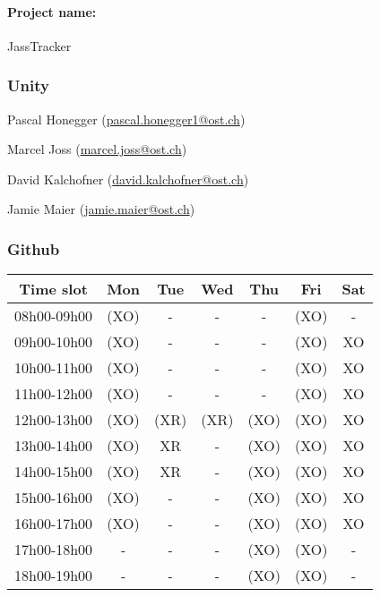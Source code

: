 \paragraph{Project name:} JassTracker

\subsubsection*{Unity}

\begin{compactenum}
    \item Pascal Honegger (\href{mailto:pascal.honegger1@ost.ch}{pascal.honegger1@ost.ch})
    \item Marcel Joss (\href{mailto:marcel.joss@ost.ch}{marcel.joss@ost.ch})
    \item David Kalchofner (\href{mailto:david.kalchofner@ost.ch}{david.kalchofner@ost.ch})
    \item Jamie Maier (\href{mailto:jamie.maier@ost.ch}{jamie.maier@ost.ch})
\end{compactenum}

\subsubsection*{Github}


\begin{flushleft}
    \begin{tabular}{|c|c|c|c|c|c|c|}
        \hline
        Time slot   & Mon  & Tue  & Wed  & Thu & Fri   & Sat \\ \hline
        08h00-09h00 & (XO) &  -   &  -   &  -  & (XO)  &  -  \\ \hline
        09h00-10h00 & (XO) &  -   &  -   &  -  & (XO)  & XO  \\ \hline
        10h00-11h00 & (XO) &  -   &  -   &  -  & (XO)  & XO  \\ \hline
        11h00-12h00 & (XO) &  -   &  -   &  -  & (XO)  & XO  \\ \hline
        \rowcolor[HTML]{EFEFEF}
        12h00-13h00 & (XO) & (XR) & (XR) & (XO) & (XO) & XO  \\ \hline
        13h00-14h00 & (XO) & XR   &  -   & (XO) & (XO) & XO  \\ \hline
        14h00-15h00 & (XO) & XR   &  -   & (XO) & (XO) & XO  \\ \hline
        15h00-16h00 & (XO) &  -   &  -   & (XO) & (XO) & XO  \\ \hline
        16h00-17h00 & (XO) &  -   &  -   & (XO) & (XO) & XO  \\ \hline
        \rowcolor[HTML]{EFEFEF}
        17h00-18h00 &  -   &  -   &  -   & (XO)  & (XO) &  -  \\ \hline
        \rowcolor[HTML]{EFEFEF}
        18h00-19h00 &  -   &  -   &  -   & (XO) & (XO) &  -  \\ \hline
    \end{tabular}

\end{flushleft}


